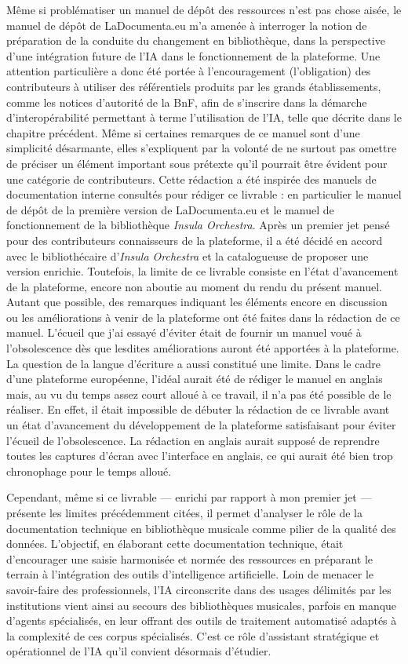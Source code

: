 Même si problématiser un manuel de dépôt des ressources n'est pas chose aisée, le manuel de dépôt de LaDocumenta.eu m'a amenée à interroger la notion de préparation de la conduite du changement en bibliothèque, dans la perspective d'une intégration future de l'IA dans le fonctionnement de la plateforme. 
Une attention particulière a donc été portée à l'encouragement (l'obligation) des contributeurs à utiliser des référentiels produits par les grands établissements, comme les notices d'autorité de la BnF, afin de s'inscrire dans la démarche d'interopérabilité permettant à terme l'utilisation de l'IA, telle que décrite dans le chapitre précédent. 
Même si certaines remarques de ce manuel sont d'une simplicité désarmante, elles s'expliquent par la volonté de ne surtout pas omettre de préciser un élément important sous prétexte qu'il pourrait être évident pour une catégorie de contributeurs. 
Cette rédaction a été inspirée des manuels de documentation interne consultés pour rédiger ce livrable : en particulier le manuel de dépôt de la première version de LaDocumenta.eu et le manuel de fonctionnement de la bibliothèque \textit{Insula Orchestra}. Après un premier jet pensé pour des contributeurs connaisseurs de la plateforme, il a été décidé en accord avec le bibliothécaire d'\textit{Insula Orchestra} et la catalogueuse de proposer une version enrichie. 
Toutefois, la limite de ce livrable consiste en l'état d'avancement de la plateforme, encore non aboutie au moment du rendu du présent manuel. Autant que possible, des remarques indiquant les éléments encore en discussion ou les améliorations à venir de la plateforme ont été faites dans la rédaction de ce manuel. 
L'écueil que j'ai essayé d'éviter était de fournir un manuel voué à l'obsolescence dès que lesdites améliorations auront été apportées à la plateforme. La question de la langue d'écriture a aussi constitué une limite. Dans le cadre d'une plateforme européenne, l'idéal aurait été de rédiger le manuel en anglais mais, au vu du temps assez court alloué à ce travail, il n'a pas été possible de le réaliser. En effet, il était impossible de débuter la rédaction de ce livrable avant un état d'avancement du développement de la plateforme satisfaisant pour éviter l'écueil de l'obsolescence. La rédaction en anglais aurait supposé de reprendre toutes les captures d'écran avec l'interface en anglais, ce qui aurait été bien trop chronophage pour le temps alloué. 

Cependant, même si ce livrable — enrichi par rapport à mon premier jet — présente les limites précédemment citées, il permet d'analyser le rôle de la documentation technique en bibliothèque musicale comme pilier de la qualité des données. 
L’objectif, en élaborant cette documentation technique, était d’encourager une saisie harmonisée et normée des ressources en préparant le terrain à l'intégration des outils d’intelligence artificielle. Loin de menacer le savoir-faire des professionnels, l'IA circonscrite dans des usages délimités par les institutions vient ainsi au secours des bibliothèques musicales, parfois en manque d’agents spécialisés, en leur offrant des outils de traitement automatisé adaptés à la complexité de ces corpus spécialisés. C'est ce rôle d'assistant stratégique et opérationnel de l'IA qu'il convient désormais d'étudier. 

	



